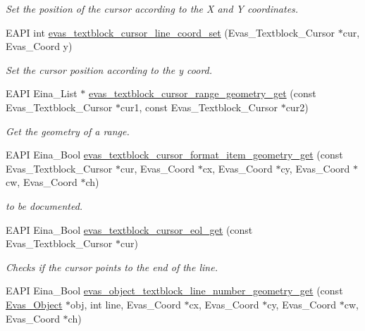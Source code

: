 \begin{DoxyCompactItemize}
\begin{DoxyCompactList}\small\item\em Set the position of the cursor according to the X and Y coordinates. \item\end{DoxyCompactList}\item 
EAPI int \hyperlink{group__Evas__Object__Textblock_gab730b9223f43f4bf255f7b3bd44f3ddb}{evas\_\-textblock\_\-cursor\_\-line\_\-coord\_\-set} (Evas\_\-Textblock\_\-Cursor $\ast$cur, Evas\_\-Coord y)
\begin{DoxyCompactList}\small\item\em Set the cursor position according to the y coord. \item\end{DoxyCompactList}\item 
EAPI Eina\_\-List $\ast$ \hyperlink{group__Evas__Object__Textblock_ga5c69a5636c96fec1835e58b361037bdc}{evas\_\-textblock\_\-cursor\_\-range\_\-geometry\_\-get} (const Evas\_\-Textblock\_\-Cursor $\ast$cur1, const Evas\_\-Textblock\_\-Cursor $\ast$cur2)
\begin{DoxyCompactList}\small\item\em Get the geometry of a range. \item\end{DoxyCompactList}\item 
EAPI Eina\_\-Bool \hyperlink{group__Evas__Object__Textblock_ga6938413ee2c12497dfa517c3575e0311}{evas\_\-textblock\_\-cursor\_\-format\_\-item\_\-geometry\_\-get} (const Evas\_\-Textblock\_\-Cursor $\ast$cur, Evas\_\-Coord $\ast$cx, Evas\_\-Coord $\ast$cy, Evas\_\-Coord $\ast$cw, Evas\_\-Coord $\ast$ch)
\begin{DoxyCompactList}\small\item\em to be documented. \item\end{DoxyCompactList}\item 
EAPI Eina\_\-Bool \hyperlink{group__Evas__Object__Textblock_gad5c9c6526512b13fe53aa763778aa6f8}{evas\_\-textblock\_\-cursor\_\-eol\_\-get} (const Evas\_\-Textblock\_\-Cursor $\ast$cur)
\begin{DoxyCompactList}\small\item\em Checks if the cursor points to the end of the line. \item\end{DoxyCompactList}\item 
EAPI Eina\_\-Bool \hyperlink{group__Evas__Object__Textblock_ga77d99df8bcb139f2a499a0dda4c5dca1}{evas\_\-object\_\-textblock\_\-line\_\-number\_\-geometry\_\-get} (const \hyperlink{group__Evas__Object__Group_ga9e19e6dd1f517a0ba437c0114d3e7c97}{Evas\_\-Object} $\ast$obj, int line, Evas\_\-Coord $\ast$cx, Evas\_\-Coord $\ast$cy, Evas\_\-Coord $\ast$cw, Evas\_\-Coord $\ast$ch)

\end{DoxyCompactItemize}
